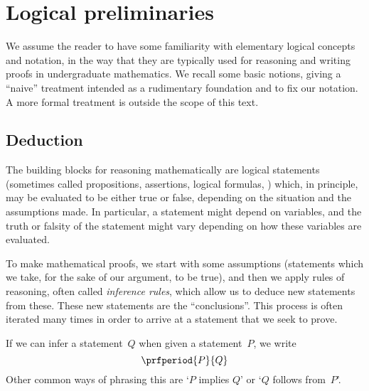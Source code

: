 
\section{Logical preliminaries}
\label{sec:logical-prelim}


We assume the reader to have some familiarity with elementary logical concepts and notation, in the way that they are typically used for reasoning and writing proofs in undergraduate mathematics.
We recall some basic notions, giving a ``naive'' treatment intended as a rudimentary foundation and to fix our notation.
A more formal treatment is outside the scope of this text.


\subsection{Deduction}

The building blocks for reasoning mathematically are logical statements (sometimes called propositions, assertions, logical formulas, \etc) which, in principle, may be evaluated to be either true or false, depending on the situation and the assumptions made.
In particular, a statement might depend on variables, and the truth or falsity of the statement might vary depending on how these variables are evaluated.

To make mathematical proofs, we start with some assumptions (statements which we take, for the sake of our argument, to be true), and then we apply rules of reasoning, often called \emph{inference rules}, which allow us to deduce new statements from these.
These new statements are the ``conclusions''.
This process is often iterated many times in order to arrive at a statement that we seek to prove.

If we can infer a statement~$Q$ when given a statement~$P$, we write
\begin{equation}
    \prfperiod
    {P}{Q}
\end{equation}
Other common ways of phrasing this are `$P$ implies $Q$' or `$Q$ follows from~$P$'.

